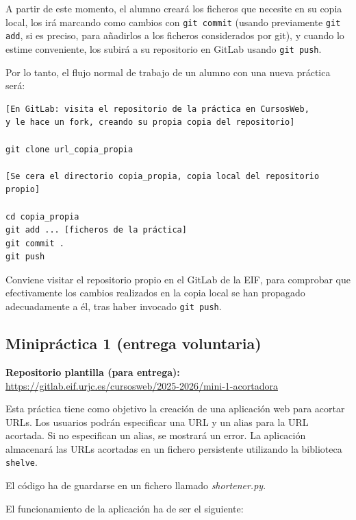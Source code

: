 A partir de este momento, el alumno creará los ficheros que necesite en su copia local, los irá marcando como cambios con \verb|git commit| (usando previamente \verb|git add|, si es preciso, para añadirlos a los ficheros considerados por git), y cuando lo estime conveniente, los subirá a su repositorio en GitLab usando \verb|git push|.

Por lo tanto, el flujo normal de trabajo de un alumno con una nueva práctica será:

\begin{verbatim}
[En GitLab: visita el repositorio de la práctica en CursosWeb,
y le hace un fork, creando su propia copia del repositorio]

git clone url_copia_propia

[Se cera el directorio copia_propia, copia local del repositorio propio]

cd copia_propia
git add ... [ficheros de la práctica]
git commit .
git push
\end{verbatim}

Conviene visitar el repositorio propio en el GitLab de la EIF, para comprobar que efectivamente los cambios realizados en la copia local se han propagado adecuadamente a él, tras haber invocado \verb|git push|.

\subsection{Minipráctica 1 (entrega voluntaria)}
\label{subsec:minipractica-1-2025}

\textbf{Repositorio plantilla (para entrega):} \\
\url{https://gitlab.eif.urjc.es/cursosweb/2025-2026/mini-1-acortadora}

Esta práctica tiene como objetivo la creación de una aplicación web para acortar URLs. Los usuarios podrán especificar una URL y un alias para la URL acortada. Si no especifican un alias, se mostrará un error. La aplicación almacenará las URLs acortadas en un fichero persistente utilizando la biblioteca \texttt{shelve}.

El código ha de guardarse en un fichero llamado \emph{shortener.py}.

El funcionamiento de la aplicación ha de ser el siguiente:

